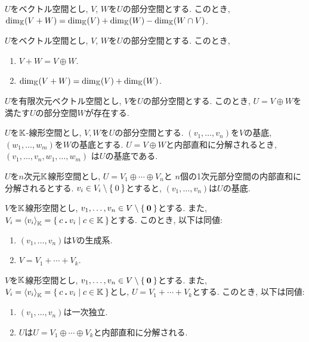 \begin{prop}
  $U$をベクトル空間とし, $V$, $W$を$U$の部分空間とする.
  このとき,  $\dim_{\mathbb{K}}(V+W)=\dim_{\mathbb{K}}(V)+\dim_{\mathbb{K}}(W) - \dim_{\mathbb{K}}(W\cap V)$.
\end{prop}
\begin{prop}
  $U$をベクトル空間とし, $V$, $W$を$U$の部分空間とする.
  このとき,
  \begin{enumerate}
  \item $V+W=V\oplus W$.
  \item $\dim_{\mathbb{K}}(V+W)=\dim_{\mathbb{K}}(V)+\dim_{\mathbb{K}}(W)$.
  \end{enumerate}
\end{prop}

\begin{prop}
  $U$を有限次元ベクトル空間とし, $V$を$U$の部分空間とする.
  このとき,
  $U=V\oplus W$を満たす$U$の部分空間$W$が存在する.
\end{prop}

\begin{prop}
  $U$を$\mathbb{K}$-線形空間とし, $V, W$を$U$の部分空間とする.
  $(v_1,\ldots,v_n)$を$V$の基底,
  $(w_1,\ldots,w_m)$を$W$の基底とする.
  $U=V\oplus W$と内部直和に分解されるとき,
  $(v_1,\ldots,v_n,w_1,\ldots,w_m)$
  は$U$の基底である.
\end{prop}

\begin{cor}
  $U$を$n$次元$\mathbb{K}$線形空間とし,
  $U=V_1\oplus \cdots \oplus V_n$と
  $n$個の1次元部分空間の内部直和に分解されるとする.
  $v_i\in V_i \setminus \Set{0}$とすると,
  $(v_1,\ldots,v_n)$は$U$の基底.
\end{cor}


\begin{prop}
  $V$を$\mathbb{K}$線形空間とし,
  $v_1,\ldots, v_n\in V\setminus\Set{\boldsymbol{0}}$とする.
  また,
  $V_i=\Braket{v_i}_{\mathbb{K}}=\Set{c\mathbin{\boldsymbol{.}}v_i|c\in\mathbb{K}}$とする.
  このとき, 以下は同値:
  \begin{enumerate}
  \item $(v_1,\ldots, v_n)$は$V$の生成系.
  \item $V=V_1+\cdots + V_k$.
  \end{enumerate}
\end{prop}

\begin{prop}
  $V$を$\mathbb{K}$線形空間とし,
  $v_1,\ldots, v_n\in V\setminus\Set{\boldsymbol{0}}$とする.
  また,
  $V_i=\Braket{v_i}_{\mathbb{K}}=\Set{c\mathbin{\boldsymbol{.}}v_i|c\in\mathbb{K}}$とし,
  $U=V_1+\cdots + V_k$とする.
  このとき, 以下は同値:
  \begin{enumerate}
  \item $(v_1,\ldots, v_n)$は一次独立.
  \item $U$は$U=V_1\oplus\cdots \oplus V_k$と内部直和に分解される.
  \end{enumerate}
\end{prop}

